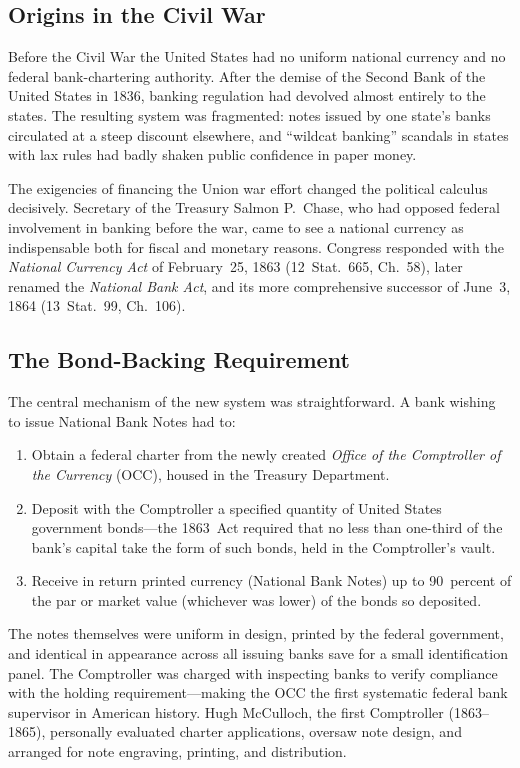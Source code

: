 \documentclass[12pt]{article}
\begin{document}
\subsection{Origins in the Civil War}

Before the Civil War the United States had no uniform national currency and no
federal bank-chartering authority.  After the demise of the Second Bank of the
United States in 1836, banking regulation had devolved almost entirely to the states.
The resulting system was fragmented: notes issued by one state's banks circulated at a
steep discount elsewhere, and ``wildcat banking'' scandals in states with lax rules
had badly shaken public confidence in paper money.

The exigencies of financing the Union war effort changed the political calculus
decisively.  Secretary of the Treasury Salmon P.\ Chase, who had opposed federal
involvement in banking before the war, came to see a national currency as
indispensable both for fiscal and monetary reasons.  Congress responded with the
\emph{National Currency Act} of February~25, 1863 (12~Stat.\ 665, Ch.\ 58), later
renamed the \emph{National Bank Act}, and its more comprehensive successor of
June~3, 1864 (13~Stat.\ 99, Ch.\ 106).

\subsection{The Bond-Backing Requirement}

The central mechanism of the new system was straightforward.  A bank wishing to
issue National Bank Notes had to:
\begin{enumerate}
  \item Obtain a federal charter from the newly created \emph{Office of the
    Comptroller of the Currency} (OCC), housed in the Treasury Department.
  \item Deposit with the Comptroller a specified quantity of United States
    government bonds---the 1863~Act required that no less than one-third of the
    bank's capital take the form of such bonds, held in the Comptroller's vault.
  \item Receive in return printed currency (National Bank Notes) up to 90~percent
    of the par or market value (whichever was lower) of the bonds so deposited.
\end{enumerate}

The notes themselves were uniform in design, printed by the federal government, and
identical in appearance across all issuing banks save for a small identification
panel.  The Comptroller was charged with inspecting banks to verify compliance with
the holding requirement---making the OCC the first systematic federal bank
supervisor in American history.  Hugh McCulloch, the first Comptroller
(1863--1865), personally evaluated charter applications, oversaw note design, and
arranged for note engraving, printing, and distribution.
\end{document}
